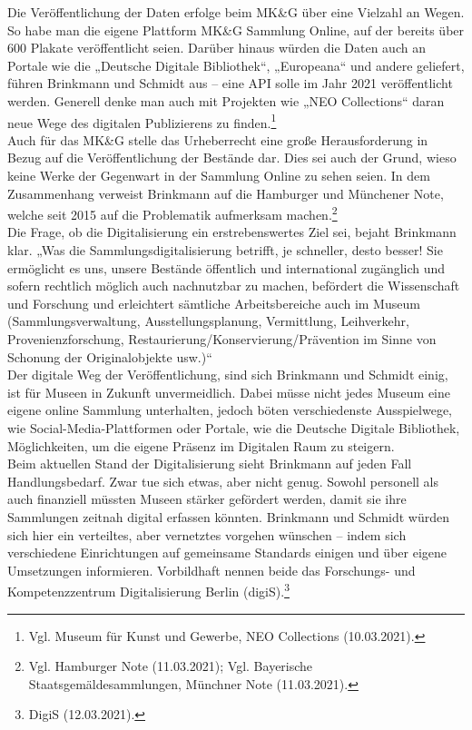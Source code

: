 \documentclass[a4paper,12pt,ngerman]{article}
\begin{document}
Die Veröffentlichung der Daten erfolge beim MK\&G über eine Vielzahl an Wegen. So habe man die eigene Plattform MK\&G Sammlung Online, auf der bereits über 600 Plakate veröffentlicht seien. Darüber hinaus würden die Daten auch an Portale wie die „Deutsche Digitale Bibliothek“, „Europeana“ und andere geliefert, führen Brinkmann und Schmidt aus -- eine API solle im Jahr 2021 veröffentlicht werden. Generell denke man auch mit Projekten wie „NEO Collections“ daran neue Wege des digitalen Publizierens zu finden.\footnote{Vgl. Museum für Kunst und Gewerbe, NEO Collections (10.03.2021).} \\
Auch für das MK\&G stelle das Urheberrecht eine große Herausforderung in Bezug auf die Veröffentlichung der Bestände dar. Dies sei auch der Grund, wieso keine Werke der Gegenwart in der Sammlung Online zu sehen seien. In dem Zusammenhang verweist Brinkmann auf die Hamburger und Münchener Note, welche seit 2015 auf die Problematik aufmerksam machen.\footnote{Vgl. Hamburger Note (11.03.2021); Vgl. Bayerische Staatsgemäldesammlungen, Münchner Note (11.03.2021).} \\
Die Frage, ob die Digitalisierung ein erstrebenswertes Ziel sei, bejaht Brinkmann klar. „Was die Sammlungsdigitalisierung betrifft, je schneller, desto besser! Sie ermöglicht es uns, unsere Bestände öffentlich und international zugänglich und sofern rechtlich möglich auch nachnutzbar zu machen, befördert die Wissenschaft und Forschung und erleichtert sämtliche Arbeitsbereiche auch im Museum (Sammlungsverwaltung, Ausstellungsplanung, Vermittlung, Leihverkehr, Provenienzforschung, Restaurierung/Konservierung/Prävention im Sinne von Schonung der Originalobjekte usw.)“ \\
Der digitale Weg der Veröffentlichung, sind sich Brinkmann und Schmidt einig, ist für Museen in Zukunft unvermeidlich. Dabei müsse nicht jedes Museum eine eigene online Sammlung unterhalten, jedoch böten verschiedenste Ausspielwege, wie Social-Media-Plattformen oder Portale, wie die Deutsche Digitale Bibliothek, Möglichkeiten, um die eigene Präsenz im Digitalen Raum zu steigern. \\
Beim aktuellen Stand der Digitalisierung sieht Brinkmann auf jeden Fall Handlungsbedarf. Zwar tue sich etwas, aber nicht genug. Sowohl personell als auch finanziell müssten Museen stärker gefördert werden, damit sie ihre Sammlungen zeitnah digital erfassen könnten. Brinkmann und Schmidt würden sich hier ein verteiltes, aber vernetztes vorgehen wünschen -- indem sich verschiedene Einrichtungen auf gemeinsame Standards einigen und über eigene Umsetzungen informieren. Vorbildhaft nennen beide das Forschungs- und Kompetenzzentrum Digitalisierung Berlin (digiS).\footnote{DigiS (12.03.2021).} \\
\end{document}
